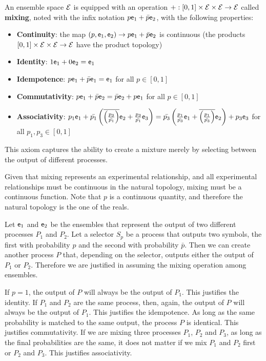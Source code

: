 \begin{axiom}
	An ensemble space $\mathcal{E}$ is equipped with an operation $+ : [0, 1] \times \mathcal{E} \times \mathcal{E} \to \mathcal{E}$ called \textbf{mixing}, noted with the infix notation $p \mathsf{e}_1 + \bar{p} \mathsf{e}_2$, with the following properties:
	\begin{itemize}
		\item \textbf{Continuity}: the map $(p, \mathsf{e}_1, \mathsf{e}_2)  \to p \mathsf{e}_1 + \bar{p} \mathsf{e}_2$ is continuous (the products $[0, 1] \times \mathcal{E} \times \mathcal{E} \to \mathcal{E}$ have the product topology)
		\item \textbf{Identity}: $1 \mathsf{e}_1 + 0 \mathsf{e}_2 = \mathsf{e}_1$
		\item \textbf{Idempotence}:  $p \mathsf{e}_1 + \bar{p} \mathsf{e}_1 = \mathsf{e}_1$ for all $p \in [0,1]$
		\item \textbf{Commutativity}: $p \mathsf{e}_1 + \bar{p} \mathsf{e}_2 = \bar{p} \mathsf{e}_2 + p \mathsf{e}_1$ for all $p \in [0,1]$
		\item \textbf{Associativity}: $p_1 \mathsf{e}_1 + \bar{p_1}\left(\overline{\left(\frac{p_3}{\bar{p_1}}\right)}\mathsf{e}_2 + \frac{p_3}{\bar{p_1}}\mathsf{e}_3\right) =  \bar{p_3}\left(\frac{p_1}{\bar{p_3}} \mathsf{e}_1 +  \overline{\left(\frac{p_1}{\bar{p_3}}\right)}\mathsf{e}_2\right) + p_3 \mathsf{e}_3$ for all $p_1, p_3 \in [0,1]$
	\end{itemize}
\end{axiom}

\begin{justification}
	This axiom captures the ability to create a mixture merely by selecting between the output of different processes.
	
	Given that mixing represents an experimental relationship, and all experimental relationships must be continuous in the natural topology, mixing must be a continuous function. Note that $p$ is a continuous quantity, and therefore the natural topology is the one of the reals.

	Let $\mathsf{e}_1$ and $\mathsf{e}_2$ be the ensembles that represent the output of two different processes $P_1$ and $P_2$. Let a selector $S_p$ be a process that outputs two symbols, the first with probability $p$ and the second with probability $\bar{p}$. Then we can create another process $P$ that, depending on the selector, outputs either the output of $P_1$ or $P_2$. Therefore we are justified in assuming the mixing operation among ensembles.

	If $p=1$, the output of $P$ will always be the output of $P_1$. This justifies the identity. If $P_1$ and $P_2$ are the same process, then, again, the output of $P$ will always be the output of $P_1$. This justifies the idempotence. As long as the same probability is matched to the same output, the process $P$ is identical. This justifies commutativity. If we are mixing three processes $P_1$, $P_2$ and $P_3$, as long as the final probabilities are the same, it does not matter if we mix $P_1$ and $P_2$ first or $P_2$ and $P_3$. This justifies associativity.
\end{justification}

